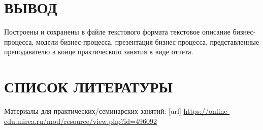 \section*{ВЫВОД}
Построены и сохранены в
файле текстового формата текстовое описание бизнес-процесса, модели
бизнес-процесса, презентация бизнес-процесса, представленные
преподавателю в конце практического занятия в виде отчета.
\newpage

\section*{СПИСОК ЛИТЕРАТУРЫ}
\begin{thebibliography}{}
    \bibitem{}  Материалы для практических/семинарских занятий: [url]
    \url{https://online-edu.mirea.ru/mod/resource/view.php?id=496092}
\end{thebibliography}
